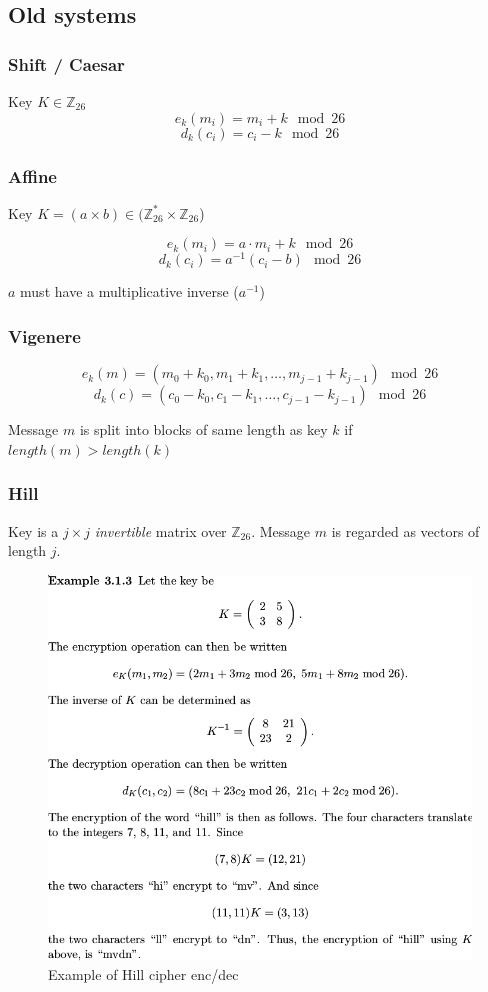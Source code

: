 \subsection{Old systems}
\subsubsection{Shift / Caesar}
Key $K \in \mathbb{Z}_{26}$
\[ e_k(m_i) =  m_i + k \mod 26 \]
\[ d_k(c_i) = c_i - k \mod 26 \]

\subsubsection{Affine}
Key $K = (a \times b) \in (\mathbb{Z}_{26}^* \times \mathbb{Z}_{26}$)

\[ e_k(m_i) = a \cdot m_i + k \mod 26 \]
\[ d_k(c_i) = a^{-1}(c_i - b) \mod 26 \]

$a$ must have a multiplicative inverse ($a^{-1}$)

\subsubsection{Vigenere}
\[ e_k (m) = (m_0 + k_0, m_1 + k_1, \ldots, m_{j-1} + k_{j-1} ) \mod 26 \]
\[ d_k (c) = (c_0 - k_0 , c_1 - k_1 , \ldots, c_{j-1} - k_{j-1} ) \mod 26 \]

Message $m$ is split into blocks of same length as key $k$ if $length(m) > length(k)$

\subsubsection{Hill}
Key is a $j \times j$ \emph{invertible} matrix over $\mathbb{Z}_{26}$. Message $m$ is regarded as vectors of length $j$.

\begin{figure}[H]
\centering
\includegraphics[scale=0.3]{images/1-hill.png}
\caption{Example of Hill cipher enc/dec}
\end{figure}